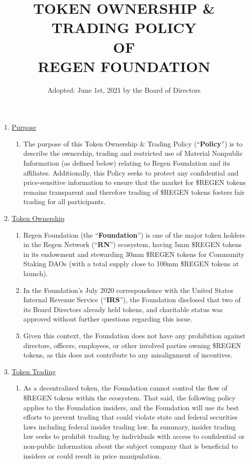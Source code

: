 \documentclass[10pt]{article}
\begin{document}
\title{TOKEN OWNERSHIP \& TRADING POLICY \protect\\ OF \protect\\ REGEN FOUNDATION}
\author{Adopted: June 1st, 2021 by the Board of Directors}
\date{} 
\maketitle
\begin{enumerate}
\item \underline{Purpose}
  \begin{enumerate}
  \item The purpose of this Token Ownership \& Trading Policy (“{\bf Policy}”) is to describe the ownership, trading and restricted use of Material Nonpublic Information (as defined below) relating to Regen Foundation and its affiliates. Additionally, this Policy seeks to protect any confidential and price-sensitive information to ensure that the market for \$REGEN tokens remains transparent and therefore trading of \$REGEN tokens fosters fair trading for all participants.
  \end{enumerate}
\item \underline{Token Ownership}
  \begin{enumerate}
  \item Regen Foundation (the “{\bf Foundation}”) is one of the major token holders in the Regen Network (“{\bf RN}”) ecosystem, having 5mm \$REGEN tokens in its endowment and stewarding 30mm \$REGEN tokens for Community Staking DAOs (with a total supply close to 100mm \$REGEN tokens at launch).
  \item In the Foundation’s July 2020 correspondence with the United States Internal Revenue Service (“{\bf IRS}”), the Foundation disclosed that two of its Board Directors already held tokens, and charitable status was approved without further questions regarding this issue.
  \item Given this context, the Foundation does not have any prohibition against directors, officers, employees, or other involved parties owning \$REGEN tokens, as this does not contribute to any misalignment of incentives.
  \end{enumerate}
\item \underline{Token Trading}
  \begin{enumerate}
  \item As a decentralized token, the Foundation cannot control the flow of \$REGEN tokens within the ecosystem. That said, the following policy applies to the Foundation insiders, and the Foundation will use its best efforts to prevent trading that could violate state and federal securities laws including federal insider trading law. In summary, insider trading law seeks to prohibit trading by individuals with access to confidential or non-public information about the subject company that is beneficial to insiders or could result in price manipulation.

\end{enumerate}
\end{enumerate}
\end{document}
